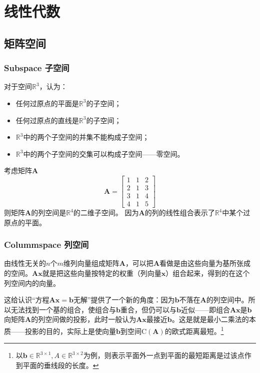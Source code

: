 \chapter{线性代数}

\section{矩阵空间}
    \subsection{Subspace 子空间}
        对于空间$\mathbb{R}^3$，认为：
        \begin{itemize}
            \item 任何过原点的平面是$\mathbb{R}^3$的子空间；
            \item 任何过原点的直线是$\mathbb{R}^3$的子空间；
            \item $\mathbb{R}^3$中的两个子空间的并集不能构成子空间；
            \item $\mathbb{R}^3$中的两个子空间的交集可以构成子空间——零空间。
        \end{itemize}
        
        考虑矩阵$\bm{A}$
        \begin{equation*}
            \bm{A}=\begin{bmatrix}      
                1&1&2\\    
                2&1&3\\    
                3&1&4\\    
                4&1&5
            \end{bmatrix}
        \end{equation*}
        则矩阵$\bm{A}$的列空间是$\mathbb{R}^4$的二维子空间。
        因为$\bm{A}$的列的线性组合表示了$\mathbb{R}^4$中某个过原点的平面。
    \subsection{Colummspace 列空间}
        由线性无关的$n$个$m$维列向量组成矩阵$\bm{A}$，可以把$\bm{A}$看做是由这些向量为基所张成的空间。$\bm{A}\bm{x}$就是把这些向量按特定的权重（列向量$\bm{x}$）组合起来，得到的在这个列空间内的向量。

        这给认识“方程$\bm{A}\bm{x}=\bm{b}$无解”提供了一个新的角度：因为$\bm{b}$不落在$\bm{A}$的列空间中。所以无法找到一个基的组合，使组合与$\bm{b}$重合，但仍可以与$\bm{b}$近似——即组合$\bm{A}\bm{x}$是$\bm{b}$向矩阵$\bm{A}$的列空间做的投影，此时一般认为$\bm{A}\bm{x}$最接近$\bm{b}$。这是就是最小二乘法的本质——投影的目的，实际上是使向量$\bm{b}$到空间$\mathrm{C}(\bm{A})$的欧式距离最短。\footnote[1]{以$\bm{b}\in \mathbb{R}^{3\times 1},A\in \mathbb{R}^{3\times 2}$为例，则表示平面外一点到平面的最短距离是过该点作到平面的垂线段的长度。}

